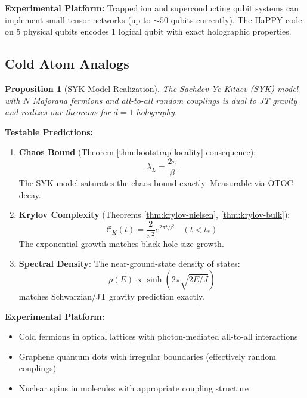 \documentclass[12pt,a4paper]{article}
\newtheorem{proposition}[theorem]{Proposition}
\begin{document}
\textbf{Experimental Platform:} Trapped ion and superconducting qubit systems can implement small tensor networks (up to $\sim 50$ qubits currently). The HaPPY code on 5 physical qubits encodes 1 logical qubit with exact holographic properties.

\subsection{Cold Atom Analogs}

\begin{proposition}[SYK Model Realization]
The Sachdev-Ye-Kitaev (SYK) model with $N$ Majorana fermions and all-to-all random couplings is dual to JT gravity and realizes our theorems for $d = 1$ holography.
\end{proposition}

\textbf{Testable Predictions:}
\begin{enumerate}
    \item \textbf{Chaos Bound} (Theorem \ref{thm:bootstrap-locality} consequence):
    \begin{equation}
    \lambda_L = \frac{2\pi}{\beta}
    \end{equation}
    The SYK model saturates the chaos bound exactly. Measurable via OTOC decay.
    
    \item \textbf{Krylov Complexity} (Theorems \ref{thm:krylov-nielsen}, \ref{thm:krylov-bulk}):
    \begin{equation}
    \mathcal{C}_K(t) = \frac{2}{\pi^2} e^{2\pi t/\beta} \quad (t < t_*)
    \end{equation}
    The exponential growth matches black hole size growth.
    
    \item \textbf{Spectral Density}: The near-ground-state density of states:
    \begin{equation}
    \rho(E) \propto \sinh(2\pi\sqrt{2E/J})
    \end{equation}
    matches Schwarzian/JT gravity prediction exactly.
\end{enumerate}

\textbf{Experimental Platform:} 
\begin{itemize}
    \item Cold fermions in optical lattices with photon-mediated all-to-all interactions
    \item Graphene quantum dots with irregular boundaries (effectively random couplings)  
    \item Nuclear spins in molecules with appropriate coupling structure
\end{itemize}
\end{document}

